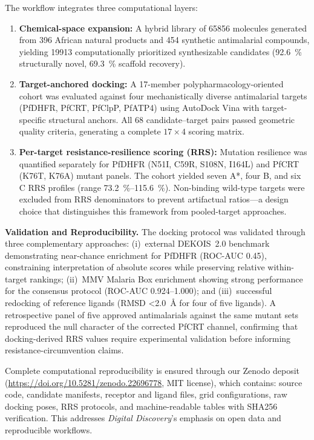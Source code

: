 \documentclass[11pt,letterpaper]{article}
\begin{document}
The workflow integrates three computational layers:
\begin{enumerate}[leftmargin=*]
\item \textbf{Chemical-space expansion:} A hybrid library of \num{65856} molecules generated from \num{396} African natural products and \num{454} synthetic antimalarial compounds, yielding \num{19913} computationally prioritized synthesizable candidates (\qty{92.6}{\percent} structurally novel, \qty{69.3}{\percent} scaffold recovery).

\item \textbf{Target-anchored docking:} A 17-member polypharmacology-oriented cohort was evaluated against four mechanistically diverse antimalarial targets (PfDHFR, PfCRT, PfClpP, PfATP4) using AutoDock Vina with target-specific structural anchors. All \num{68} candidate--target pairs passed geometric quality criteria, generating a complete $\num{17}\times\num{4}$ scoring matrix.

\item \textbf{Per-target resistance-resilience scoring (RRS):} Mutation resilience was quantified separately for PfDHFR (N51I, C59R, S108N, I164L) and PfCRT (K76T, K76A) mutant panels. The cohort yielded seven A*, four B, and six C RRS profiles (range \qtyrange{73.2}{115.6}{\percent}). Non-binding wild-type targets were excluded from RRS denominators to prevent artifactual ratios---a design choice that distinguishes this framework from pooled-target approaches.
\end{enumerate}

\vspace{0.3em}

\noindent\textbf{Validation and Reproducibility.}
The docking protocol was validated through three complementary approaches: (i)~external DEKOIS~2.0 benchmark demonstrating near-chance enrichment for PfDHFR (ROC-AUC \num{0.45}), constraining interpretation of absolute scores while preserving relative within-target rankings; (ii)~MMV Malaria Box enrichment showing strong performance for the consensus protocol (ROC-AUC \numrange{0.924}{1.000}); and (iii)~successful redocking of reference ligands (RMSD \qty{<2.0}{\angstrom} for four of five ligands). A retrospective panel of five approved antimalarials against the same mutant sets reproduced the null character of the corrected PfCRT channel, confirming that docking-derived RRS values require experimental validation before informing resistance-circumvention claims.

Complete computational reproducibility is ensured through our Zenodo deposit (\url{https://doi.org/10.5281/zenodo.22696778}, MIT license), which contains: source code, candidate manifests, receptor and ligand files, grid configurations, raw docking poses, RRS protocols, and machine-readable tables with SHA256 verification. This addresses \textit{Digital Discovery}'s emphasis on open data and reproducible workflows.
\end{document}
